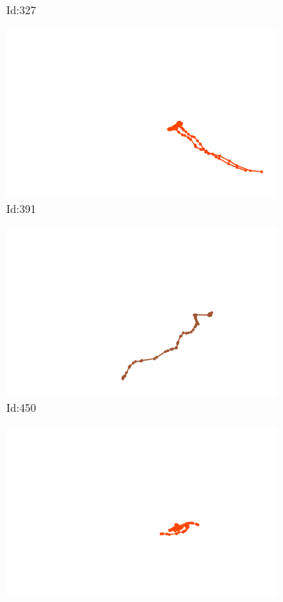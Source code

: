 \documentclass[12pt,twoside]{report}
\begin{document}
\begin{figure}
\begin{subfigure}[b]{0.20\textwidth}
\caption{Id:327}
\end{subfigure}
\begin{subfigure}[b]{0.20\textwidth}
\centering
\includegraphics[width=\textwidth]{../trajectories/391.png}
\caption{Id:391}
\end{subfigure}
\begin{subfigure}[b]{0.20\textwidth}
\centering
\includegraphics[width=\textwidth]{../trajectories/450.png}
\caption{Id:450}
\end{subfigure}
\begin{subfigure}[b]{0.20\textwidth}
\centering
\includegraphics[width=\textwidth]{../trajectories/461.png}

\end{subfigure}
\end{figure}
\end{document}
